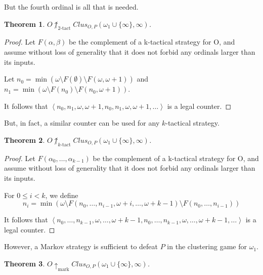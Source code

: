 \documentclass[11pt]{article}
\theoremstyle{plain}
\newtheorem{theorem}{Theorem}
\theoremstyle{definition}
\theoremstyle{remark}
\newcommand{\markwin}{\uparrow_{\text{mark}}}
\newcommand{\ktactwin}[1]{\uparrow_{#1\text{-tact}}}
\begin{document}
But the fourth ordinal is all that is needed.

\begin{theorem}
$O\not\ktactwin{2}Clus_{O,P}(\omega_1\cup\{\infty\},\infty)$.
\end{theorem}

\begin{proof}
Let $F(\alpha,\beta)$ be the complement of a k-tactical strategy for O, and assume without loss of generality that it does not forbid any ordinals larger than its inputs.

Let $n_0=\min(\omega\setminus F(\emptyset)\setminus F(\omega,\omega+1))$ and $n_1 = \min(\omega\setminus F(n_0)\setminus F(n_0,\omega+1))$.

It follows that $\left<n_0,n_1,\omega,\omega+1,n_0,n_1,\omega,\omega+1,\dots\right>$ is a legal counter.
\end{proof}

But, in fact, a similar counter can be used for any $k$-tactical strategy.

\begin{theorem}
$O\not\ktactwin{k}Clus_{O,P}(\omega_1\cup\{\infty\},\infty)$.
\end{theorem}

\begin{proof}
Let $F(\alpha_0,\dots,\alpha_{k-1})$ be the complement of a k-tactical strategy for O, and assume without loss of generality that it does not forbid any ordinals larger than its inputs.

For $0\leq i < k$, we define \[n_i = \min(\omega\setminus F(n_0,\dots,n_{i-1},\omega+i,\dots,\omega+k-1)\setminus F(n_0,\dots,n_{i-1}))\]

It follows that $\left<n_0,\dots,n_{k-1},\omega,\dots,\omega+k-1,n_0,\dots,n_{k-1},\omega,\dots,\omega+k-1,\dots\right>$ is a legal counter.
\end{proof}

However, a Markov strategy is sufficient to defeat $P$ in the clustering game for $\omega_1$.

\begin{theorem}
$O\markwin Clus_{O,P}(\omega_1\cup\{\infty\},\infty)$.
\end{theorem}
\end{document}
